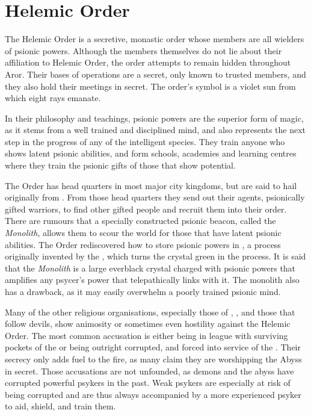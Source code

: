 \section{Helemic Order}
\label{sec:Helemic Order}

The Helemic Order is a secretive, monastic order whose members are all
wielders of psionic powers. Although the members themselves do not lie about
their affiliation to Helemic Order, the order attempts to remain hidden
throughout Aror. Their bases of operations are a secret, only known to trusted
members, and they also hold their meetings in secret. The order's symbol is a
violet sun from which eight rays emanate.

In their philosophy and teachings, psionic powers are the superior form of
magic, as it stems from a well trained and disciplined mind, and also
represents the next step in the progress of any of the intelligent
species. They train anyone who shows latent psionic abilities, and form
schools, academies and learning centres where they train the psionic gifts of
those that show potential.

The Order has head quarters in most major city kingdoms, but are said to hail
originally from . From those head quarters they
send out their agents, psionically gifted warriors, to find other gifted
people and recruit them into their order. There are rumours that a specially
constructed psionic beacon, called the \emph{Monolith}, allows them to scour
the world for those that have latent psionic abilities. The Order rediscovered
how to store psionic powers in , a process originally
invented by the , which turns the crystal green in the
process. It is said that the \emph{Monolith} is a large everblack crystal
charged with psionic powers that amplifies any psycer's power that
telepathically links with it. The monolith also has a drawback, as it may
easily overwhelm a poorly trained psionic mind.

Many of the other religious organisations, especially those of
, , and those that follow devils, show
animosity or sometimes even hostility against the Helemic Order. The most
common accusation is either being in league with surviving pockets of the
 or being outright corrupted, and forced into service of
the . Their secrecy only adds fuel to the fire, as many
claim they are worshipping the Abyss in secret. Those accusations are not
unfounded, as demons and the abyss have corrupted powerful psykers in the
past. Weak psykers are especially at risk of being corrupted and are thus
always accompanied by a more experienced psyker to aid, shield, and train
them.


